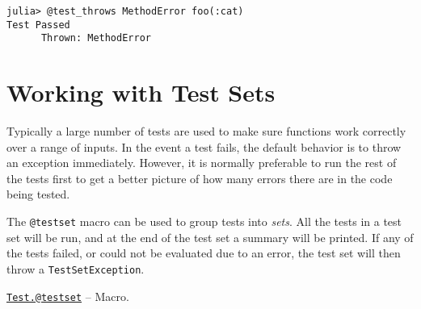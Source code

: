 \begin{verbatim}
julia> @test_throws MethodError foo(:cat)
Test Passed
      Thrown: MethodError
\end{verbatim}



\hypertarget{12305239832165996459}{}


\section{Working with Test Sets}



Typically a large number of tests are used to make sure functions work correctly over a range of inputs. In the event a test fails, the default behavior is to throw an exception immediately. However, it is normally preferable to run the rest of the tests first to get a better picture of how many errors there are in the code being tested.



The \texttt{@testset} macro can be used to group tests into \emph{sets}. All the tests in a test set will be run, and at the end of the test set a summary will be printed. If any of the tests failed, or could not be evaluated due to an error, the test set will then throw a \texttt{TestSetException}.


\hypertarget{6603917731228482697}{} 
\hyperlink{6603917731228482697}{\texttt{Test.@testset}}  -- {Macro.}

